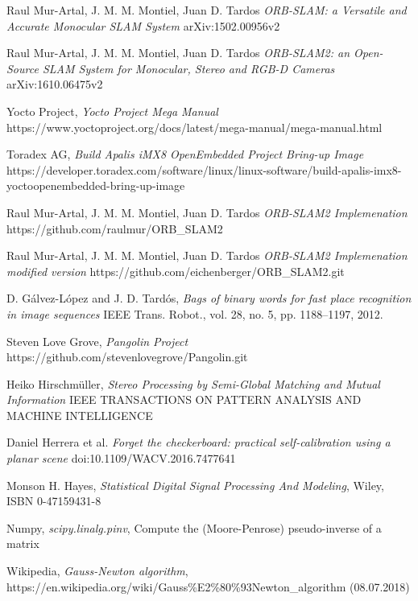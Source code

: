 \documentclass[11pt,a4paper,titlepage,oneside]{report}
\begin{document}
\begin{thebibliography}{1}

  Raul Mur-Artal, J. M. M. Montiel, Juan D. Tardos
  \textit{ORB-SLAM: a Versatile and Accurate Monocular SLAM System}
  arXiv:1502.00956v2

  Raul Mur-Artal, J. M. M. Montiel, Juan D. Tardos
  \textit{ORB-SLAM2: an Open-Source SLAM System for Monocular, Stereo and RGB-D Cameras}
	arXiv:1610.06475v2 

	Yocto Project,
	\textit{Yocto Project Mega Manual}
	https://www.yoctoproject.org/docs/latest/mega-manual/mega-manual.html

	Toradex AG,
	\textit{Build Apalis iMX8 OpenEmbedded Project Bring-up Image}
	https://developer.toradex.com/software/linux/linux-software/build-apalis-imx8-yoctoopenembedded-bring-up-image

  Raul Mur-Artal, J. M. M. Montiel, Juan D. Tardos
  \textit{ORB-SLAM2 Implemenation}
	https://github.com/raulmur/ORB\_SLAM2

  Raul Mur-Artal, J. M. M. Montiel, Juan D. Tardos
  \textit{ORB-SLAM2 Implemenation modified version}
	https://github.com/eichenberger/ORB\_SLAM2.git

	D. Gálvez-López and J. D. Tardós,
	\textit{Bags of binary words for fast place recognition in image sequences}
	IEEE Trans. Robot., vol. 28, no. 5, pp. 1188–1197, 2012.

	Steven Love Grove,
	\textit{Pangolin Project}
	https://github.com/stevenlovegrove/Pangolin.git

	Heiko Hirschmüller,
	\textit{ Stereo Processing by Semi-Global Matching and Mutual Information}
	IEEE TRANSACTIONS ON PATTERN ANALYSIS AND MACHINE INTELLIGENCE
	 
  Daniel Herrera et al.
  \textit{Forget the checkerboard: practical self-calibration using a planar scene}
  doi:10.1109/WACV.2016.7477641

  Monson H. Hayes,
  \textit{Statistical Digital Signal Processing And Modeling},
  Wiley, ISBN 0-47159431-8

  Numpy,
  \textit{scipy.linalg.pinv},
  Compute the (Moore-Penrose) pseudo-inverse of a matrix

  Wikipedia,
  \textit{Gauss-Newton algorithm},
  https://en.wikipedia.org/wiki/Gauss\%E2\%80\%93Newton\_algorithm (08.07.2018)


\end{thebibliography}
\end{document}
